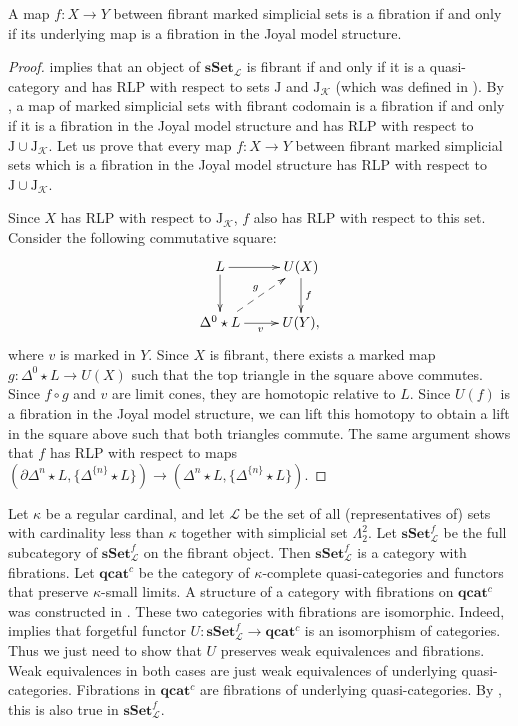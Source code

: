 \documentclass[reqno]{amsart}
\theoremstyle{definition}
\theoremstyle{remark}
\newcommand{\cat}[1]{\mathbf{#1}}
\newcommand{\sSet}{\cat{sSet}}
\newcommand{\qcat}{\cat{qcat}}
\newcommand{\join}{\star}
\newcommand{\J}{\mathrm{J}}
\numberwithin{figure}{section}
\begin{document}
\begin{prop}
A map $f : X \to Y$ between fibrant marked simplicial sets is a fibration if and only if its underlying map is a fibration in the Joyal model structure.
\end{prop}
\begin{proof}
 implies that an object of $\sSet_\mathcal{L}$ is fibrant if and only if it is a quasi-category
and has RLP with respect to sets $\J$ and $\J_\mathcal{K}$ (which was defined in ).
By \cite[Proposition~3.6]{f-model-structures}, a map of marked simplicial sets with fibrant codomain is a fibration
if and only if it is a fibration in the Joyal model structure and has RLP with respect to $\J \cup \J_\mathcal{K}$.
Let us prove that every map $f : X \to Y$ between fibrant marked simplicial sets which is a fibration in the Joyal model structure has RLP with respect to $\J \cup \J_\mathcal{K}$.

Since $X$ has RLP with respect to $\J_\mathcal{K}$, $f$ also has RLP with respect to this set.
Consider the following commutative square:
\[ \xymatrix{ L \ar[r] \ar[d] & U(X) \ar[d]^f \\
              \Delta^0 \join L \ar[r]_v \ar@{-->}[ur]^g & U(Y),
            } \]
where $v$ is marked in $Y$.
Since $X$ is fibrant, there exists a marked map $g : \Delta^0 \join L \to U(X)$ such that the top triangle in the square above commutes.
Since $f \circ g$ and $v$ are limit cones, they are homotopic relative to $L$.
Since $U(f)$ is a fibration in the Joyal model structure, we can lift this homotopy to obtain a lift in the square above such that both triangles commute.
The same argument shows that $f$ has RLP with respect to maps $(\partial \Delta^n \join L, \{ \Delta^{\{n\}} \join L \}) \to (\Delta^n \join L, \{ \Delta^{\{n\}} \join L \})$.
\end{proof}

Let $\kappa$ be a regular cardinal, and let $\mathcal{L}$ be the set of all (representatives of) sets with cardinality less than $\kappa$ together with simplicial set $\Lambda^2_2$.
Let $\sSet_\mathcal{L}^f$ be the full subcategory of $\sSet_\mathcal{L}^f$ on the fibrant object.
Then $\sSet_\mathcal{L}^f$ is a category with fibrations.
Let $\qcat^c$ be the category of $\kappa$-complete quasi-categories and functors that preserve $\kappa$-small limits.
A structure of a category with fibrations on $\qcat^c$ was constructed in \cite{szumilo}.
These two categories with fibrations are isomorphic.
Indeed,  implies that forgetful functor $U : \sSet_\mathcal{L}^f \to \qcat^c$ is an isomorphism of categories.
Thus we just need to show that $U$ preserves weak equivalences and fibrations.
Weak equivalences in both cases are just weak equivalences of underlying quasi-categories.
Fibrations in $\qcat^c$ are fibrations of underlying quasi-categories.
By , this is also true in $\sSet_\mathcal{L}^f$.



\end{document}
